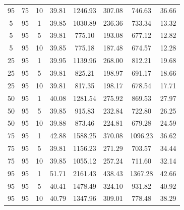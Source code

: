 \begin{table}[H]
\begin{tabular}{ccc|c|c|c|c|c}
95 & 75 & 10 & \cellcolor{gray!50}39.81 & \cellcolor{gray!1}1246.93 & \cellcolor{gray!1}307.08 & \cellcolor{gray!24}746.63 & 36.66\\
5 & 95 & 1 & \cellcolor{gray!50}39.85 & \cellcolor{gray!1}1030.89 & \cellcolor{gray!1}236.36 & \cellcolor{gray!28}733.34 & 13.32\\
5 & 95 & 5 & \cellcolor{gray!50}39.81 & \cellcolor{gray!42}775.10 & \cellcolor{gray!35}193.08 & \cellcolor{gray!45}677.12 & 12.82\\
5 & 95 & 10 & \cellcolor{gray!50}39.85 & \cellcolor{gray!42}775.18 & \cellcolor{gray!40}187.48 & \cellcolor{gray!46}674.57 & 12.28\\
25 & 95 & 1 & \cellcolor{gray!49}39.95 & \cellcolor{gray!1}1139.96 & \cellcolor{gray!1}268.00 & \cellcolor{gray!4}812.21 & 19.68\\
25 & 95 & 5 & \cellcolor{gray!50}39.81 & \cellcolor{gray!34}825.21 & \cellcolor{gray!30}198.97 & \cellcolor{gray!41}691.17 & 18.66\\
25 & 95 & 10 & \cellcolor{gray!50}39.81 & \cellcolor{gray!35}817.35 & \cellcolor{gray!30}198.17 & \cellcolor{gray!45}678.54 & 17.71\\
50 & 95 & 1 & \cellcolor{gray!48}40.08 & \cellcolor{gray!1}1281.54 & \cellcolor{gray!1}275.92 & \cellcolor{gray!1}869.53 & 27.97\\
50 & 95 & 5 & \cellcolor{gray!50}39.85 & \cellcolor{gray!19}915.83 & \cellcolor{gray!1}232.84 & \cellcolor{gray!31}722.80 & 26.25\\
50 & 95 & 10 & \cellcolor{gray!50}39.88 & \cellcolor{gray!26}873.46 & \cellcolor{gray!6}224.81 & \cellcolor{gray!45}679.28 & 24.59\\
75 & 95 & 1 & \cellcolor{gray!19}42.88 & \cellcolor{gray!1}1588.25 & \cellcolor{gray!1}370.08 & \cellcolor{gray!1}1096.23 & 36.62\\
75 & 95 & 5 & \cellcolor{gray!50}39.81 & \cellcolor{gray!1}1156.23 & \cellcolor{gray!1}271.29 & \cellcolor{gray!37}703.57 & 34.44\\
75 & 95 & 10 & \cellcolor{gray!50}39.85 & \cellcolor{gray!1}1055.12 & \cellcolor{gray!1}257.24 & \cellcolor{gray!35}711.60 & 32.14\\
95 & 95 & 1 & \cellcolor{gray!1}51.71 & \cellcolor{gray!1}2161.43 & \cellcolor{gray!1}438.43 & \cellcolor{gray!1}1367.28 & 42.66\\
95 & 95 & 5 & \cellcolor{gray!44}40.41 & \cellcolor{gray!1}1478.49 & \cellcolor{gray!1}324.10 & \cellcolor{gray!1}931.82 & 40.92\\
95 & 95 & 10 & \cellcolor{gray!41}40.79 & \cellcolor{gray!1}1347.96 & \cellcolor{gray!1}309.01 & \cellcolor{gray!14}778.48 & 38.29

\end{tabular}
\end{table}

